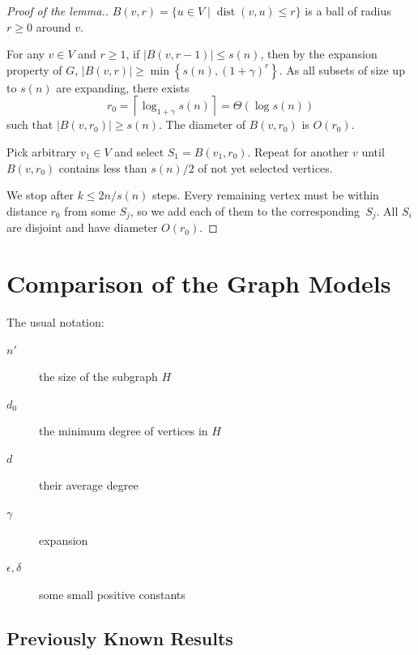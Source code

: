 \documentclass{beamer}
\newcommand{\ceil}[1]{{\left\lceil{#1}\right\rceil}}
\DeclareMathOperator*{\dist}{dist}
\newcommand{\autotitle}{\secname\ifdefempty{\subsecname}{}{~--- \subsecname}}
\newcommand{\clearsubsecname}{\long\def\subsecname{}}
\newcommand{\smalldisplayskips}{
    \setlength{\abovedisplayskip}{3pt}
    \setlength{\belowdisplayskip}{3pt}}
\begin{document}
\begin{frame}{\autotitle}
    \small\smalldisplayskips
    \begin{proof}[Proof of the lemma.]
        $B(v,r)=\{u\in V\;|\;\dist(v,u)\leq r\}$ is
        a ball of radius $r\geq 0$ around $v$.
        
        For any $v\in V$ and $r\geq 1$, if $|B(v,r-1)|\leq s(n)$,
        then by the expansion property of $G$,
        $|B(v,r)|\geq\min\left\{s(n),(1+\gamma)^r\right\}$.
        As all subsets of size up to $s(n)$ are expanding, there exists
        \begin{equation*}
            r_0=\ceil{\log_{1+\gamma}s(n)}=\Theta(\log s(n))
        \end{equation*}
        such that $|B(v,r_0)|\geq s(n)$. The diameter of $B(v,r_0)$ is $O(r_0)$.
        
        Pick arbitrary $v_1\in V$ and select $S_1=B(v_1,r_0)$.
        Repeat for another $v$ until $B(v,r_0)$ contains
        less than $s(n)/2$ of not yet selected vertices.
        
        We stop after $k\leq2n/s(n)$ steps.
        Every remaining vertex must be within distance $r_0$ from some $S_j$,
        so we add each of them to the corresponding~$S_j$.
        All $S_i$ are disjoint and have diameter $O(r_0)$.
    \end{proof}
\end{frame}

\section{Comparison of the Graph Models}
\clearsubsecname

\begin{frame}{\autotitle}
    The usual notation:
    \begin{description}
        \item[$n'$] the size of the subgraph $H$
        \item[$d_0$] the minimum degree of vertices in $H$
        \item[$d$] their average degree
        \item[$\gamma$] expansion
        \item[$\epsilon,\delta$] some small positive constants
    \end{description}
\end{frame}

\subsection{Previously Known Results}
\end{document}
